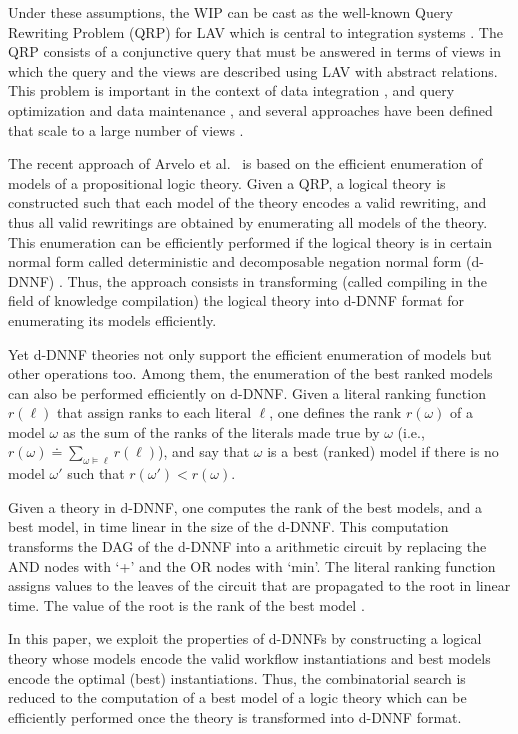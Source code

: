\documentclass{llncs}
\begin{document}
Under these assumptions, the WIP can be cast as the well-known Query
Rewriting Problem (QRP) for LAV which is central to integration systems
\cite{halevy:survey}. The QRP consists of a conjunctive query that must be
answered in terms of views in which the query and the views are described
using LAV with abstract relations.
This problem is important in the context of data integration
\cite{Chen05,JaudoinPRST05}, and query optimization and data maintenance
\cite{AfratiLU07,levy:bucket}, and several approaches have been defined
that scale to a large number of views
\cite{arvelo:aaai06,pods:DuschkaG97,sac:DuschkaG97,levy:bucket,pottinger:minicon}.

The recent approach of Arvelo et al.\ \cite{arvelo:aaai06} is based 
on the efficient enumeration of models of a propositional logic theory. 
Given a QRP, a logical theory is constructed such that each model of
the theory encodes a valid rewriting, and thus all valid rewritings
are obtained by enumerating all models of the theory. This enumeration
can be efficiently performed if the logical theory is in certain 
normal form called deterministic and decomposable negation normal
form (d-DNNF) \cite{darwiche:d-dnnfs}. Thus, the approach consists in
transforming (called compiling in the field of knowledge compilation)
the logical theory into d-DNNF format for enumerating its models efficiently.

Yet d-DNNF theories not only support the efficient enumeration of
models but other operations too. Among them, the enumeration of
the best ranked models can also be performed efficiently on d-DNNF.
Given a literal ranking function $r(\ell)$ that assign ranks
to each literal $\ell$, one defines the rank $r(\omega)$ of a
model $\omega$ as the sum of the ranks of the literals made true
by $\omega$ (i.e., $r(\omega)\doteq\sum_{\omega\vDash\ell}r(\ell)$),
and say that $\omega$ is a best (ranked) model if there is no model
$\omega'$ such that $r(\omega')<r(\omega)$.

Given a theory in d-DNNF, one computes the rank of the best models,
and a best model, in time linear in the size of the d-DNNF.
This computation transforms the DAG of the d-DNNF into a arithmetic
circuit by replacing the AND nodes with `+' and the OR nodes with `min'.
The literal ranking function assigns
values to the leaves of the circuit that are propagated to the
root in linear time. The value of the root is the rank of the
best model \cite{darwiche:weighted}.

In this paper, we exploit the properties of d-DNNFs by constructing
a logical theory whose models encode the valid workflow instantiations
and best models encode the optimal (best) instantiations.
Thus, the combinatorial search is reduced to the computation
of a best model of a logic theory which can be efficiently
performed once the theory is transformed into d-DNNF format.
\end{document}
